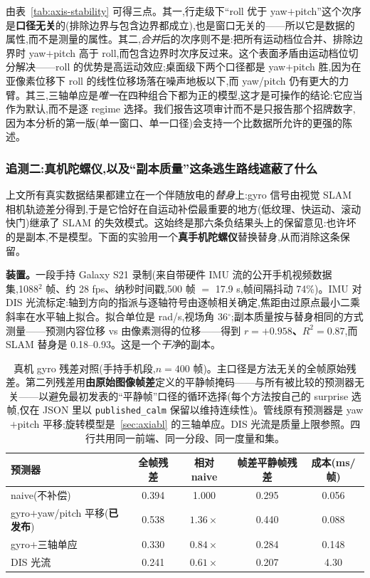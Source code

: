 \documentclass[UTF8,12pt,a4paper]{ctexart}
\begin{document}
由表~\ref{tab:axis-stability} 可得三点。其一,行走级下``roll 优于 yaw$+$pitch''这个次序是\textbf{口径无关}的(排除边界与包含边界都成立),也是窗口无关的——所以它是数据的属性,而不是测量的属性。其二,\emph{合并}后的次序则不是:把所有运动档位合并、排除边界时 yaw$+$pitch 高于 roll,而包含边界时次序反过来。这个表面矛盾由运动档位切分解决——roll 的优势是高运动效应;桌面级下两个口径都是 yaw$+$pitch 胜,因为在亚像素位移下 roll 的线性位移场落在噪声地板以下,而 yaw/pitch 仍有更大的力臂。其三,三轴单应是\emph{唯一}在四种组合下都为正的模型,这才是可操作的结论:它应当作为默认,而不是逐 regime 选择。我们报告这项审计而不是只报告那个招牌数字,因为本分析的第一版(单一窗口、单一口径)会支持一个比数据所允许的更强的陈述。

\subsubsection{追测二:真机陀螺仪,以及``副本质量''这条逃生路线遮蔽了什么}
\label{sec:realimu}

上文所有真实数据结果都建立在一个伴随放电的\emph{替身}上:gyro 信号由视觉 SLAM 相机轨迹差分得到,于是它恰好在自运动补偿最重要的地方(低纹理、快运动、滚动快门)继承了 SLAM 的失效模式。这始终是那六条负结果头上的保留意见:也许坏的是副本,不是模型。下面的实验用一个\textbf{真手机陀螺仪}替换替身,从而消除这条保留。

\textbf{装置。}一段手持 Galaxy S21 录制(来自带硬件 IMU 流的公开手机视频数据集,1088$^2$ 帧、约 28 fps、纳秒时间戳,500 帧 $=$ 17.9 s,帧间隔抖动 74\%)。IMU 对 DIS 光流标定:轴到方向的指派与逐轴符号由逐帧相关确定,焦距由过原点最小二乘斜率在水平轴上拟合。拟合单位是 rad/s,视场角 36$^\circ$;副本质量按与替身相同的方式测量——预测内容位移 vs 由像素测得的位移——得到 \textbf{$r = +0.958$、$R^2 = 0.87$},而 SLAM 替身是 0.18--0.93。这是一个\emph{干净}的副本。

\begin{table}[htbp]
  \centering
  \small
  \caption{真机 gyro 残差对照(手持手机段,$n{=}400$ 帧)。主口径是方法无关的全帧原始残差。第二列残差用\textbf{由原始图像帧差}定义的平静帧掩码——与所有被比较的预测器无关——以避免最初发表的``平静帧''口径的循环选择(每个方法按自己的 surprise 选帧,仅在 JSON 里以 \texttt{published\_calm} 保留以维持连续性)。管线原有预测器是 yaw$+$pitch 平移;旋转模型是~\ref{sec:axiabl} 的三轴单应。DIS 光流是质量上限参照。四行共用同一前端、同一分段、同一度量和集。}
  \label{tab:realimu}
  \begin{tabular}{lcccc}
    \toprule
    预测器 & 全帧残差 & 相对 naive & 帧差平静帧残差 & 成本(ms/帧) \\
    \midrule
    naive(不补偿) & 0.394 & 1.000 & 0.295 & 0.056 \\
    gyro$+$yaw/pitch 平移(\textbf{已发布}) & 0.538 & $\mathbf{1.36\times}$ & 0.440 & 0.088 \\
    gyro$+$三轴单应 & $\mathbf{0.330}$ & $\mathbf{0.84\times}$ & 0.284 & 0.148 \\
    DIS 光流 & 0.241 & $0.61\times$ & 0.207 & 4.30 \\
    \bottomrule
  \end{tabular}
\end{table}
\end{document}
